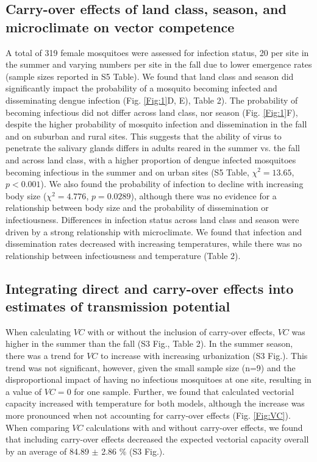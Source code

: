 \documentclass{bmcart}
\begin{document}
\subsection*{Carry-over effects of land class, season, and microclimate on vector competence}

A total of 319 female mosquitoes were assessed for infection status, 20 per site in the summer and varying numbers per site in the fall due to lower emergence rates (sample sizes reported in S5 Table). We found that land class and season did significantly impact the probability of a mosquito becoming infected and disseminating dengue infection (Fig. \ref{Fig:1}D, E), Table 2). The probability of becoming infectious did not differ across land class, nor season (Fig. \ref{Fig:1}F), despite the higher probability of mosquito infection and dissemination in the fall and on suburban and rural sites. This suggests that the ability of virus to penetrate the salivary glands differs in adults reared in the summer vs. the fall and across land class, with a higher proportion of dengue infected mosquitoes becoming infectious in the summer and on urban sites (S5 Table, $\chi^2=13.65$, $p<0.001$). We also found the probability of infection to decline with increasing body size ($\chi^2=4.776$, $p=0.0289$), although there was no evidence for a relationship between body size and the probability of dissemination or infectiousness. Differences in infection status across land class and season were driven by a strong relationship with microclimate. We found that infection and dissemination rates decreased with increasing temperatures, while there was no relationship between infectiousness and temperature (Table 2).

\subsection*{Integrating direct and carry-over effects into estimates of transmission potential}

When calculating $VC$ with or without the inclusion of carry-over effects, $VC$ was higher in the summer than the fall (S3 Fig., Table 2). In the summer season, there was a trend for $VC$ to increase with increasing urbanization (S3 Fig.). This trend was not significant, however, given the small sample size (n=9) and the disproportional impact of having no infectious mosquitoes at one site, resulting in a value of $VC=0$ for one sample. Further, we found that calculated vectorial capacity increased with temperature for both models, although the increase was more pronounced when not accounting for carry-over effects (Fig. \ref{Fig:VC}). When comparing $VC$ calculations with and without carry-over effects, we found that including carry-over effects decreased the expected vectorial capacity overall by an average of 84.89 $\pm$ 2.86 \% (S3 Fig.).
\end{document}
